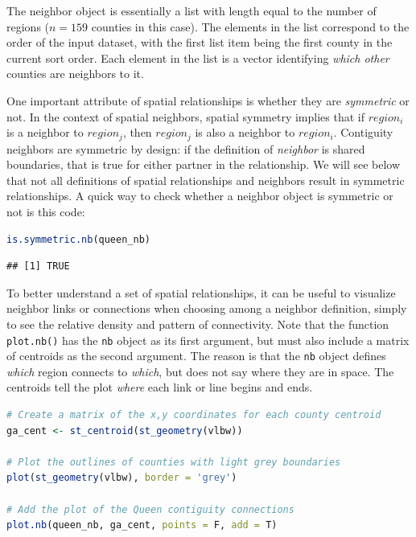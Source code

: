 \documentclass[
]{book}
\newcommand{\passthrough}[1]{#1}
\begin{document}
The neighbor object is essentially a list with length equal to the number of regions (\(n=159\) counties in this case). The elements in the list correspond to the order of the input dataset, with the first list item being the first county in the current sort order. Each element in the list is a vector identifying \emph{which other} counties are neighbors to it.

One important attribute of spatial relationships is whether they are \emph{symmetric} or not. In the context of spatial neighbors, spatial symmetry implies that if \(region_i\) is a neighbor to \(region_j\), then \(region_j\) is also a neighbor to \(region_i\). Contiguity neighbors are symmetric by design: if the definition of \emph{neighbor} is shared boundaries, that is true for either partner in the relationship. We will see below that not all definitions of spatial relationships and neighbors result in symmetric relationships. A quick way to check whether a neighbor object is symmetric or not is this code:

\begin{lstlisting}[language=R]
is.symmetric.nb(queen_nb)
\end{lstlisting}

\begin{lstlisting}
## [1] TRUE
\end{lstlisting}

To better understand a set of spatial relationships, it can be useful to visualize neighbor links or connections when choosing among a neighbor definition, simply to see the relative density and pattern of connectivity. Note that the function \passthrough{\lstinline!plot.nb()!} has the \passthrough{\lstinline!nb!} object as its first argument, but must also include a matrix of centroids as the second argument. The reason is that the \passthrough{\lstinline!nb!} object defines \emph{which} region connects to \emph{which}, but does not say where they are in space. The centroids tell the plot \emph{where} each link or line begins and ends.

\begin{lstlisting}[language=R]
# Create a matrix of the x,y coordinates for each county centroid
ga_cent <- st_centroid(st_geometry(vlbw))

# Plot the outlines of counties with light grey boundaries
plot(st_geometry(vlbw), border = 'grey')

# Add the plot of the Queen contiguity connections
plot.nb(queen_nb, ga_cent, points = F, add = T)
\end{lstlisting}
\end{document}
